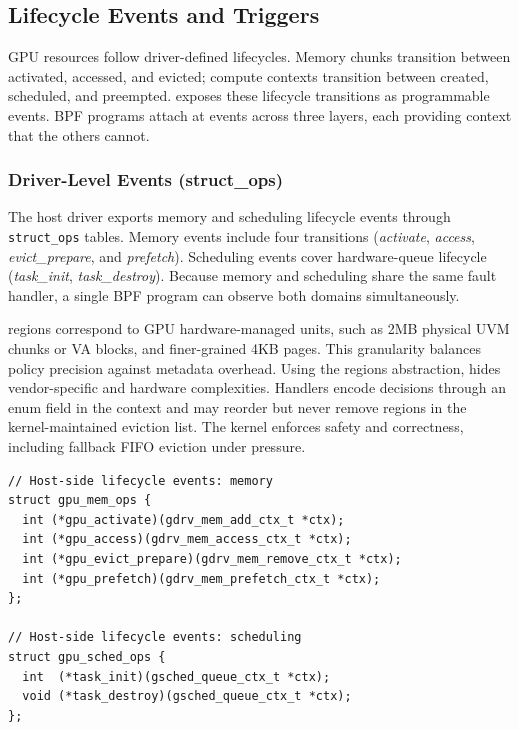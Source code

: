 

\subsection{Lifecycle Events and Triggers}
\label{sec:design-interfaces}

GPU resources follow driver-defined lifecycles. Memory chunks transition between activated, accessed, and evicted; compute contexts transition between created, scheduled, and preempted. \sys exposes these lifecycle transitions as programmable events. BPF programs attach at events across three layers, each providing context that the others cannot.

\subsubsection{Driver-Level Events (struct\_ops)}

The host driver exports memory and scheduling lifecycle events through \texttt{struct\_ops} tables. Memory events include four transitions (\emph{activate}, \emph{access}, \emph{evict\_prepare}, and \emph{prefetch}). Scheduling events cover hardware-queue lifecycle (\emph{task\_init}, \emph{task\_destroy}). Because memory and scheduling share the same fault handler, a single BPF program can observe both domains simultaneously.

\sys regions correspond to GPU hardware-managed units, such as 2MB physical UVM chunks or VA blocks, and finer-grained 4KB pages. This granularity balances policy precision against metadata overhead. Using the regions abstraction, \sys hides vendor-specific and hardware complexities. Handlers encode decisions through an enum field in the context and may reorder but never remove regions in the kernel-maintained eviction list. The kernel enforces safety and correctness, including fallback FIFO eviction under pressure.

\begin{lstlisting}
// Host-side lifecycle events: memory
struct gpu_mem_ops {
  int (*gpu_activate)(gdrv_mem_add_ctx_t *ctx);
  int (*gpu_access)(gdrv_mem_access_ctx_t *ctx);
  int (*gpu_evict_prepare)(gdrv_mem_remove_ctx_t *ctx);
  int (*gpu_prefetch)(gdrv_mem_prefetch_ctx_t *ctx);
};

// Host-side lifecycle events: scheduling
struct gpu_sched_ops {
  int  (*task_init)(gsched_queue_ctx_t *ctx);
  void (*task_destroy)(gsched_queue_ctx_t *ctx);
};
\end{lstlisting}

